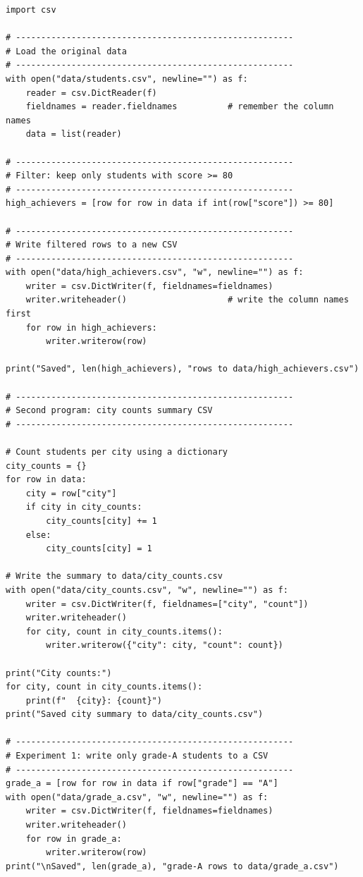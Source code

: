 \documentclass{cslab}
\begin{document}
\begin{lstlisting}
import csv

# -------------------------------------------------------
# Load the original data
# -------------------------------------------------------
with open("data/students.csv", newline="") as f:
    reader = csv.DictReader(f)
    fieldnames = reader.fieldnames          # remember the column names
    data = list(reader)

# -------------------------------------------------------
# Filter: keep only students with score >= 80
# -------------------------------------------------------
high_achievers = [row for row in data if int(row["score"]) >= 80]

# -------------------------------------------------------
# Write filtered rows to a new CSV
# -------------------------------------------------------
with open("data/high_achievers.csv", "w", newline="") as f:
    writer = csv.DictWriter(f, fieldnames=fieldnames)
    writer.writeheader()                    # write the column names first
    for row in high_achievers:
        writer.writerow(row)

print("Saved", len(high_achievers), "rows to data/high_achievers.csv")

# -------------------------------------------------------
# Second program: city counts summary CSV
# -------------------------------------------------------

# Count students per city using a dictionary
city_counts = {}
for row in data:
    city = row["city"]
    if city in city_counts:
        city_counts[city] += 1
    else:
        city_counts[city] = 1

# Write the summary to data/city_counts.csv
with open("data/city_counts.csv", "w", newline="") as f:
    writer = csv.DictWriter(f, fieldnames=["city", "count"])
    writer.writeheader()
    for city, count in city_counts.items():
        writer.writerow({"city": city, "count": count})

print("City counts:")
for city, count in city_counts.items():
    print(f"  {city}: {count}")
print("Saved city summary to data/city_counts.csv")

# -------------------------------------------------------
# Experiment 1: write only grade-A students to a CSV
# -------------------------------------------------------
grade_a = [row for row in data if row["grade"] == "A"]
with open("data/grade_a.csv", "w", newline="") as f:
    writer = csv.DictWriter(f, fieldnames=fieldnames)
    writer.writeheader()
    for row in grade_a:
        writer.writerow(row)
print("\nSaved", len(grade_a), "grade-A rows to data/grade_a.csv")


\end{lstlisting}
\end{document}
